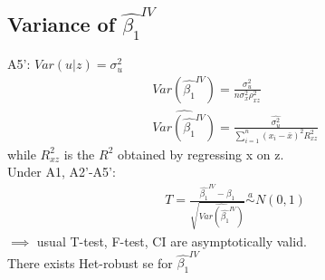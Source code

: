 \documentclass{article}
\theoremstyle{definition}
\theoremstyle{thrm}
\theoremstyle{lma}
\theoremstyle{ppst}
\theoremstyle{crlr}
\begin{document}
\subsection{Variance of $\hat{\beta_1}^{IV}$}
A5': $Var(u|z) = \sigma_u^2$
\begin{align*}
	Var(\hat{\beta_1}^{IV}) = \frac{\sigma_u^2}{n\sigma_x^2\rho_{xz}^2}\\
	\widehat{Var(\hat{\beta_1}^{IV})} = \frac{\hat{\sigma_u^2}}{\sum_{i=1}^n(x_i-\bar{x})^2R_{xz}^2}
\end{align*}
while $R_{xz}^2$ is the $R^2$ obtained by regressing x on z.\\
Under A1, A2'-A5':
\begin{align*}
	T = \frac{\hat{\beta_1}^{IV}-\beta_1}{\sqrt{\widehat{Var(\hat{\beta_1}^{IV})}}} \stackrel{a}{\sim} N(0,1)
\end{align*}
$\implies$ usual T-test, F-test, CI are asymptotically valid.\\
There exists Het-robust se for $\hat{\beta_1}^{IV}$
\end{document}
